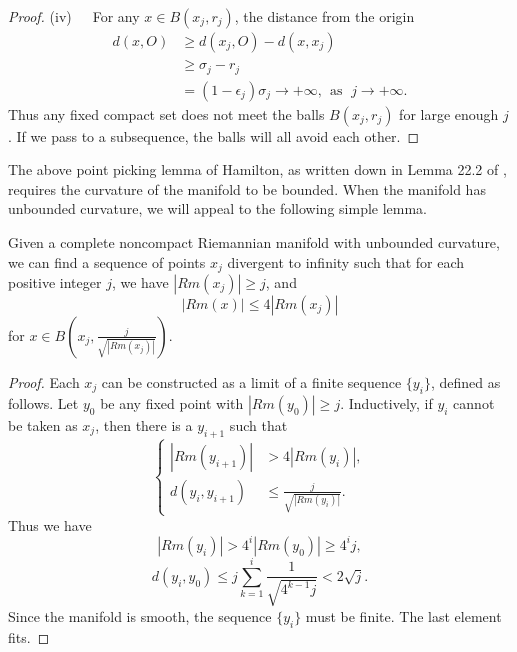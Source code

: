 \begin{proof}
\smallskip
(iv)\ \ \ For any $x\in B(x_j,r_j)$, the distance from the origin
\begin{displaymath}
\begin{split}
   d(x,O)&\geq d(x_j,O)-d(x,x_j)\\[1mm]
         &\geq \sigma_j-r_j\\[1mm]
         &= (1-\epsilon_j)\sigma_j\rightarrow+\infty,\ \ \mbox{as }\;
         j\rightarrow+\infty.
\end{split}
\end{displaymath}
Thus any fixed compact set does not meet the balls $B(x_j,r_j)$
for large enough $j$. If we pass to a subsequence, the balls will
all avoid each other.
\end{proof}

The above point picking lemma of Hamilton, as written down in
Lemma 22.2 of \cite{Ha95F}, requires the curvature of the manifold
to be bounded. When the manifold has unbounded curvature, we will
appeal to the following simple lemma.

\begin{lemma}
  \label{lem:cz-unbounded-curvature-point-selection}

Given a complete noncompact Riemannian manifold with unbounded
curvature, we can find a sequence of points $x_j$ divergent to
infinity such that for each positive integer $j$, we have
$|Rm(x_{j})|\geq j$, and
$$
|Rm(x)|\leq4|Rm(x_{j})|
$$
for $x\in B(x_j,\frac{j}{\sqrt{|Rm(x_{j})|}})$.
\end{lemma}

\begin{proof}
Each $x_j$ can be constructed as a limit of a finite sequence
$\{y_i\}$, defined as follows. Let $y_0$ be any fixed point with
$|Rm(y_{0})| \geq j$. Inductively, if $y_i$ cannot be taken as
$x_j$, then there is a $y_{i+1}$ such that
\begin{equation*}
 \left\{
\begin{aligned}
|Rm(y_{i+1})|&  > 4|Rm(y_{i})|,\\
d(y_i,y_{i+1}) &  \leqslant \frac{j}{\sqrt{|Rm(y_{i})|}}.
\end{aligned}
\right.
\end{equation*}
Thus we have
$$
|Rm(y_{i})|> 4^i|Rm(y_{0})|\geq 4^ij,$$
$$d(y_i,y_{0})\leq
j\sum^i_{k=1}\frac{1}{\sqrt{4^{k-1}j}}<2\sqrt{j}.$$ Since the
manifold is smooth, the sequence $\{y_i\}$ must be finite. The
last element fits.
\end{proof}


